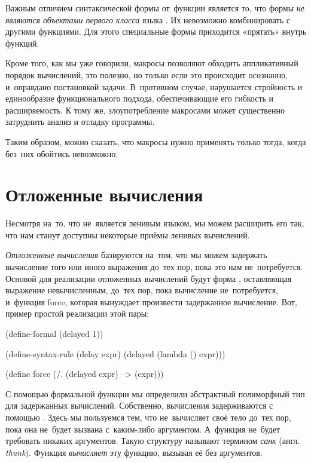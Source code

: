 Важным отличием синтаксической формы от~функции является то, что формы \emph{не являются объектами первого класса} языка \Scheme. Их невозможно комбинировать с  другими функциями. Для этого специальные формы приходится «прятать» внутрь функций.

Кроме того, как мы уже говорили, макросы позволяют обходить аппликативный порядок вычислений, это полезно, но только если это происходит осознанно, и~оправдано постановкой задачи. В~противном случае, нарушается стройность и единообразие функционального подхода, обеспечивающие его гибкость и расширяемость. К тому же, злоупотребление макросами может существенно затруднить анализ и отладку программы.

Таким образом, можно сказать, что макросы нужно применять только тогда, когда без~них обойтись невозможно.

\section{Отложенные вычисления}%
\label{delay}Несмотря на~то, что \Scheme не~является ленивым языком, мы можем расширить его так, что нам станут доступны некоторые приёмы ленивых вычислений.

\emph{Отложенные вычисления} базируются на~том, что мы можем задержать вычисление того или иного выражения до~тех пор, пока это нам не~потребуется. Основой для реализации отложенных вычислений будут форма , оставляющая выражение  невычисленным, до~тех пор, пока вычисление не~потребуется, и~функция \si{force}, которая вынуждает произвести задержанное вычисление.
\label{lazy}Вот, пример простой реализации этой пары:

\begin{Definition}
(define-formal (delayed 1))

(define-syntax-rule (delay expr)
  (delayed (lambda () expr)))

(define force
  (/. (delayed expr) --> (expr)))
\end{Definition}
\newpage

С помощью формальной функции  мы определили абстрактный полиморфный тип для задержанных вычислений. Собственно, вычисления задерживаются с помощью . Здесь мы пользуемся тем, что  не~вычисляет своё тело до~тех пор, пока она не~будет вызвана с~каким-либо аргументом. А~функция  не~будет требовать никаких аргументов. Такую структуру называют термином \emph{санк} (англ. \emph{thunk}). Функция  \emph{вычисляет} эту функцию, вызывая её без аргументов. 

